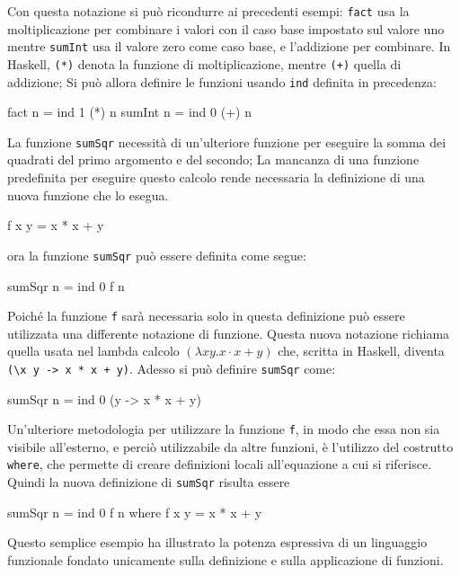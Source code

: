 Con questa notazione si pu\`o ricondurre ai precedenti esempi: 
\texttt{fact} usa la moltiplicazione per combinare i valori con il caso base impostato sul valore uno
 mentre \texttt{sumInt} usa il valore zero come caso base, e l'addizione 
per combinare. In Haskell, \texttt{(*)} denota la funzione di 
moltiplicazione, mentre \texttt{(+)} quella di addizione; Si pu\`{o} allora 
definire le funzioni  usando \verb"ind" definita in precedenza:
\begin{haskellCode}
fact   n = ind 1 (*) n
sumInt n = ind 0 (+) n
\end{haskellCode}
La funzione \verb"sumSqr" necessit\`a di un'ulteriore funzione per 
eseguire la somma dei quadrati del primo argomento e del secondo; La mancanza di una funzione predefinita
per eseguire questo calcolo rende necessaria la definizione di una nuova funzione che lo esegua.
\begin{haskellCode}
f x y = x * x + y
\end{haskellCode}
ora la funzione \verb"sumSqr" pu\`{o} essere definita come segue:
\begin{haskellCode}
sumSqr n = ind 0 f n
\end{haskellCode}
Poich\'{e} la funzione \verb"f" sar\`a necessaria solo 
in questa definizione pu\`{o}  essere utilizzata una differente notazione di funzione. Questa nuova notazione richiama quella
usata nel lambda calcolo $(\lambda x y.x \cdot x+y)$ che, 
scritta in Haskell, diventa \lstinline{(\x y -> x * x + y)}. Adesso si pu\`o definire \verb"sumSqr" 
come:
\begin{haskellCode}
sumSqr n = ind 0 (\x y -> x * x + y) 
\end{haskellCode}
Un'ulteriore metodologia per utilizzare la funzione \verb"f", in modo che essa non sia visibile all'esterno, e perci\`{o} utilizzabile da altre 
funzioni, \`{e} l'utilizzo del costrutto \lstinline{where}, che permette di creare definizioni locali all'equazione a cui si riferisce. Quindi la nuova definizione di \verb"sumSqr" risulta essere
\begin{haskellCode}
sumSqr n = ind 0 f n
  where
    f x y = x * x + y
\end{haskellCode}
Questo semplice esempio ha illustrato la potenza espressiva di un 
linguaggio funzionale fondato unicamente sulla definizione e sulla 
applicazione di funzioni.

